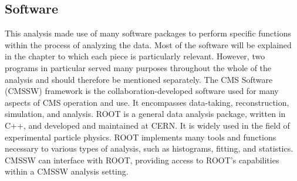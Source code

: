 \subsection{Software}
\label{over:software}



This analysis made use of many software packages 
to perform specific functions within 
the process of analyzing the data.  
Most of the software will be explained 
in the chapter to which each piece is particularly 
relevant.  
However, two programs in particular 
served many purposes 
throughout the whole of the analysis and 
should therefore be mentioned separately.  
%
The CMS Software (CMSSW) framework 
\cite{cmssw}
is the collaboration-developed software 
used for many aspects of CMS operation and use.  
It encompasses data-taking, reconstruction, 
simulation, and analysis.  
%
ROOT \cite{root} 
is a general data analysis package, 
written in C++, 
and developed and maintained at CERN. 
It is widely used in the field of 
experimental particle physics.  
ROOT implements many tools and functions 
necessary to various types of analysis, 
such as histograms, fitting, 
and statistics.  
CMSSW can interface with ROOT, 
providing access to ROOT's %
capabilities within a CMSSW 
analysis setting.  

